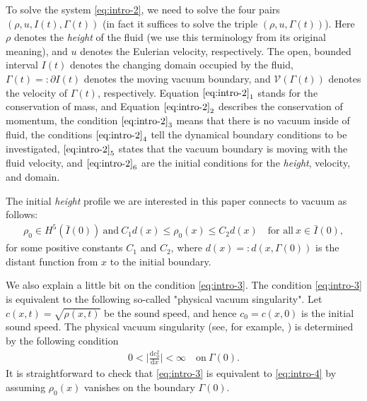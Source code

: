 \documentclass[11pt, reqno]{amsart}
\newcommand{\diff}{\mathrm{d}}
\numberwithin{equation}{section}
\begin{document}
To solve the system \eqref{eq:intro-2}, we need to solve the four pairs \((\rho, u, I(t), \Gamma(t))\) (in fact it suffices to solve the triple \((\rho, u, \Gamma(t))\)).
Here \(\rho\) denotes the \emph{height} of the fluid (we use this terminology
from its original meaning), and  \(u\) denotes the Eulerian velocity, respectively.
The open, bounded interval \(I(t)\) denotes the changing domain occupied by the
fluid, \(\Gamma(t)=\colon \partial I(t)\) denotes the moving vacuum boundary, and \(\mathcal{V}(\Gamma(t))\) denotes the velocity of \(\Gamma(t)\), respectively.
Equation \(\eqref{eq:intro-2}_1\) stands for the conservation of mass, and Equation \(\eqref{eq:intro-2}_2\) describes the conservation of
momentum, the condition \(\eqref{eq:intro-2}_3\) means that there is no vacuum inside of fluid,
the conditions \(\eqref{eq:intro-2}_4\) tell the dynamical boundary conditions to be investigated, \(\eqref{eq:intro-2}_5\) states that the vacuum boundary is moving with the fluid velocity, and \(\eqref{eq:intro-2}_6\) are the initial conditions for the \emph{height}, velocity, and domain.

The initial \emph{height} profile we are interested in this paper connects to vacuum as follows:
\begin{align}\label{eq:intro-3}
\rho_0\in H^5(\bar{I}(0))\ \text{and}\  C_1d(x)\leq \rho_0(x)\leq C_2d(x) \quad \text{for\ all}\ x\in \bar{I}(0),
\end{align}
for some positive constants \(C_1\) and \(C_2\), where \(d(x)=\colon d(x,\Gamma(0))\) is the distant function from \(x\) to the initial boundary.

We also explain a little bit on the condition \eqref{eq:intro-3}. The condition \eqref{eq:intro-3} is equivalent to the following so-called "physical vacuum singularity". Let \(c(x,t)=\sqrt{\rho(x,t)}\) be the sound speed, and hence \(c_0=c(x,0)\) is the initial sound speed.
The physical vacuum singularity (see, for example, \cite{MR2779087, MR1485360}) is determined by the following condition
\begin{equation}\label{eq:intro-4}
\begin{aligned}
 0<\bigg|\frac{\diff c_0^2}{\diff x}\bigg|<\infty \quad \mbox{on}\ \Gamma(0).
\end{aligned}
\end{equation}
It is straightforward to check that \eqref{eq:intro-3} is equivalent to \eqref{eq:intro-4} by assuming \(\rho_0(x)\) vanishes on the boundary \(\Gamma(0)\).
\end{document}
